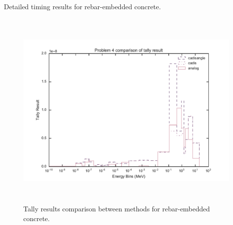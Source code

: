 \begin{table}[h!]
  \centering
  
  \caption[Detailed timing results for rebar-embedded concrete]
  {Detailed timing results for rebar-embedded concrete.}
  \label{tab:rebartimes}
\end{table}

\begin{figure}[h!]
  \centering
  \includegraphics[height=10cm]{./chapters/characterization_probs/figures/char/prob_4/problem_4_tally_result_compare.pdf}
  \caption[Tally results comparison between methods for rebar-embedded concrete.]
  {Tally results comparison between methods for rebar-embedded concrete.}
  \label{fig:rebarresult}
\end{figure}

